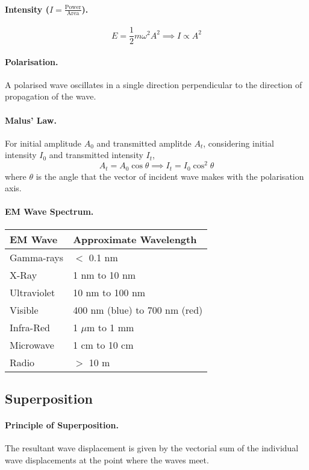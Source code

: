 \documentclass{article}
\begin{document}
\paragraph{Intensity ($I = \frac{\text{Power}}{\text{Area}}$).} \begin{equation}
E = \frac{1}{2}m\omega^2 A^2 \implies I \propto A^2 \end{equation}

\paragraph{Polarisation.} A polarised wave oscillates in a single direction
perpendicular to the direction of propagation of the wave.

\paragraph{Malus' Law.} For initial amplitude $A_0$ and transmitted amplitde
$A_t$, considering initial intensity $I_0$ and transmitted intensity $I_t$,
\begin{equation} A_t = A_0\cos\theta \implies I_t = I_0\cos^2\theta
\end{equation} where $\theta$ is the angle that the vector of incident wave
makes with the polarisation axis.

\paragraph{EM Wave Spectrum.} \begin{tabular}{|l|l|} \hline \textbf{EM Wave} &
  \textbf{Approximate Wavelength} \\ \hline Gamma-rays & $<$ 0.1 nm \\ X-Ray & 1
  nm to 10 nm \\ Ultraviolet & 10 nm to 100 nm \\ Visible & 400 nm (blue) to 700
  nm (red) \\ Infra-Red & 1 $\mu$m to 1 mm \\ Microwave & 1 cm to 10 cm \\ Radio
& $>$ 10 m \\ \hline \end{tabular}

\subsection{Superposition}

\paragraph{Principle of Superposition.} The resultant wave displacement is given
by the vectorial sum of the individual wave displacements at the point where the
waves meet.
\end{document}
